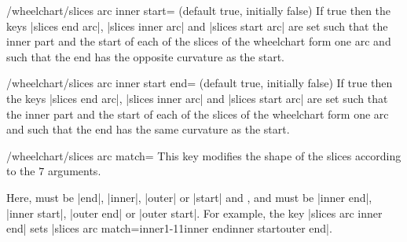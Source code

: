\documentclass[a4paper,english,dvipsnames]{ltxdoc}
\begin{document}
\begin{key}{/wheelchart/slices arc inner start= (default true, initially false)}
If true then the keys |slices end arc|, |slices inner arc| and |slices start arc| are set such that the inner part and the start of each of the slices of the wheelchart form one arc and such that the end has the opposite curvature as the start.
\begin{codeexample}[width=10cm]
\end{codeexample}
\end{key}
\begin{key}{/wheelchart/slices arc inner start end= (default true, initially false)}
If true then the keys |slices end arc|, |slices inner arc| and |slices start arc| are set such that the inner part and the start of each of the slices of the wheelchart form one arc and such that the end has the same curvature as the start.
\begin{codeexample}[width=10cm]
\begin{tikzpicture}
\wheelchart[
    data=,
    gap polar=5,
    middle={%
        slices arc\\%
        inner start end%
    },
    middle style={font=\ttfamily},
    slices arc inner start end,
    value=1,
    wheel data=\WCvarC,
    wheel data pos=0.4
]{\exampleforthismanual}
\end{tikzpicture}
\end{codeexample}
\end{key}
\begin{key}{/wheelchart/slices arc match=}
This key modifies the shape of the slices according to the $7$ arguments.

Here,  must be |end|, |inner|, |outer| or |start| and ,  and  must be |inner end|, |inner start|, |outer end| or |outer start|. For example, the key |slices arc inner end| sets |slices arc match={inner}{1}{-1}{1}{inner end}{inner start}{outer end}|.
\begin{codeexample}[width=10cm]
\end{codeexample}
\end{key}
\end{document}
